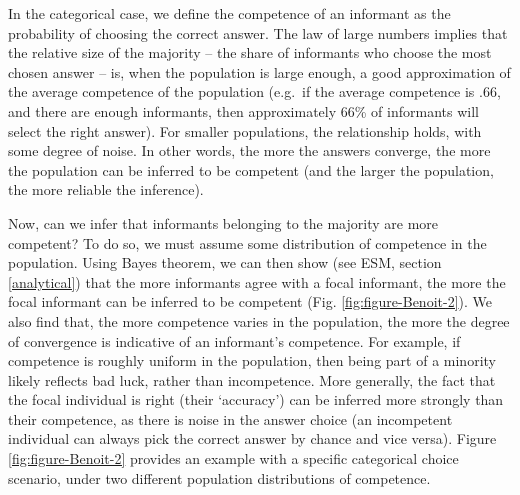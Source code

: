 \documentclass[
  doc,floatsintext]{apa6}
\begin{document}
In the categorical case, we define the competence of an informant as the probability of choosing the correct answer. The law of large numbers implies that the relative size of the majority -- the share of informants who choose the most chosen answer -- is, when the population is large enough, a good approximation of the average competence of the population (e.g.~if the average competence is .66, and there are enough informants, then approximately 66\% of informants will select the right answer). For smaller populations, the relationship holds, with some degree of noise. In other words, the more the answers converge, the more the population can be inferred to be competent (and the larger the population, the more reliable the inference).

Now, can we infer that informants belonging to the majority are more competent? To do so, we must assume some distribution of competence in the population. Using Bayes theorem, we can then show (see ESM, section \ref{analytical}) that the more informants agree with a focal informant, the more the focal informant can be inferred to be competent (Fig. \ref{fig:figure-Benoit-2}). We also find that, the more competence varies in the population, the more the degree of convergence is indicative of an informant's competence. For example, if competence is roughly uniform in the population, then being part of a minority likely reflects bad luck, rather than incompetence. More generally, the fact that the focal individual is right (their `accuracy') can be inferred more strongly than their competence, as there is noise in the answer choice (an incompetent individual can always pick the correct answer by chance and vice versa). Figure \ref{fig:figure-Benoit-2} provides an example with a specific categorical choice scenario, under two different population distributions of competence.
\end{document}
